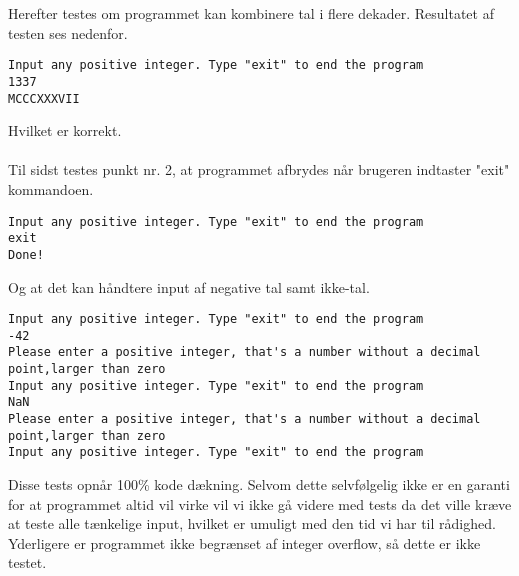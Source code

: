 	Herefter testes om programmet kan kombinere tal i flere dekader. Resultatet af testen ses nedenfor.
	\begin{lstlisting}[caption=Test af dekadekombination]
Input any positive integer. Type "exit" to end the program
1337
MCCCXXXVII
	\end{lstlisting}
	Hvilket er korrekt. \\
	\\
	Til sidst testes punkt nr. 2, at programmet afbrydes når brugeren indtaster "exit" kommandoen.
	\begin{lstlisting}[caption=Test af exit kommando]
Input any positive integer. Type "exit" to end the program
exit
Done!
	\end{lstlisting}
	Og at det kan håndtere input af negative tal samt ikke-tal.
	\begin{lstlisting}[caption=Test af dårligt input]
Input any positive integer. Type "exit" to end the program
-42
Please enter a positive integer, that's a number without a decimal point,larger than zero
Input any positive integer. Type "exit" to end the program
NaN
Please enter a positive integer, that's a number without a decimal point,larger than zero
Input any positive integer. Type "exit" to end the program
	\end{lstlisting}
	
	Disse tests opnår 100\% kode dækning. Selvom dette selvfølgelig ikke er en garanti for at programmet altid vil virke vil vi ikke gå videre med tests da det ville kræve at teste alle tænkelige input, hvilket er umuligt med den tid vi har til rådighed. Yderligere er programmet ikke begrænset af integer overflow, så dette er ikke testet.